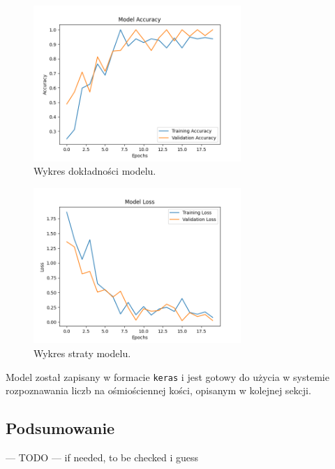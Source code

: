 \begin{figure}[H]
    \centering
    \includegraphics[width=0.7\textwidth]{chapters/04-czytanie/figures/ModelAcc1}
    \caption{Wykres dokładności modelu.}
    \label{fig:ModelAcc}
\end{figure}

\begin{figure}[H]
    \centering
    \includegraphics[width=0.7\textwidth]{chapters/04-czytanie/figures/ModelLoss1}
    \caption{Wykres straty modelu.}
    \label{fig:ModelLoss}
\end{figure}

Model został zapisany w formacie \texttt{keras} i jest gotowy do użycia w systemie rozpoznawania liczb na ośmiościennej kości,
opisanym w kolejnej sekcji.


\subsection{Podsumowanie}

--- TODO ---
if needed, to be checked i guess
